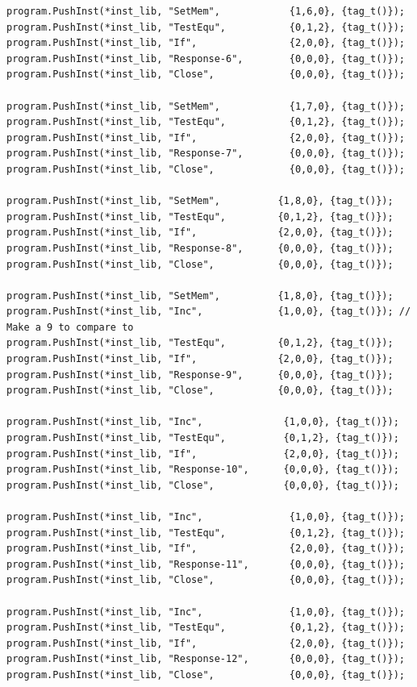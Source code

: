 \documentclass[]{book}
\begin{document}
\begin{verbatim}
program.PushInst(*inst_lib, "SetMem",            {1,6,0}, {tag_t()});
program.PushInst(*inst_lib, "TestEqu",           {0,1,2}, {tag_t()});
program.PushInst(*inst_lib, "If",                {2,0,0}, {tag_t()});
program.PushInst(*inst_lib, "Response-6",        {0,0,0}, {tag_t()});
program.PushInst(*inst_lib, "Close",             {0,0,0}, {tag_t()});

program.PushInst(*inst_lib, "SetMem",            {1,7,0}, {tag_t()});
program.PushInst(*inst_lib, "TestEqu",           {0,1,2}, {tag_t()});
program.PushInst(*inst_lib, "If",                {2,0,0}, {tag_t()});
program.PushInst(*inst_lib, "Response-7",        {0,0,0}, {tag_t()});
program.PushInst(*inst_lib, "Close",             {0,0,0}, {tag_t()});

program.PushInst(*inst_lib, "SetMem",          {1,8,0}, {tag_t()});
program.PushInst(*inst_lib, "TestEqu",         {0,1,2}, {tag_t()});
program.PushInst(*inst_lib, "If",              {2,0,0}, {tag_t()});
program.PushInst(*inst_lib, "Response-8",      {0,0,0}, {tag_t()});
program.PushInst(*inst_lib, "Close",           {0,0,0}, {tag_t()});

program.PushInst(*inst_lib, "SetMem",          {1,8,0}, {tag_t()});
program.PushInst(*inst_lib, "Inc",             {1,0,0}, {tag_t()}); // Make a 9 to compare to
program.PushInst(*inst_lib, "TestEqu",         {0,1,2}, {tag_t()});
program.PushInst(*inst_lib, "If",              {2,0,0}, {tag_t()});
program.PushInst(*inst_lib, "Response-9",      {0,0,0}, {tag_t()});
program.PushInst(*inst_lib, "Close",           {0,0,0}, {tag_t()});

program.PushInst(*inst_lib, "Inc",              {1,0,0}, {tag_t()});
program.PushInst(*inst_lib, "TestEqu",          {0,1,2}, {tag_t()});
program.PushInst(*inst_lib, "If",               {2,0,0}, {tag_t()});
program.PushInst(*inst_lib, "Response-10",      {0,0,0}, {tag_t()});
program.PushInst(*inst_lib, "Close",            {0,0,0}, {tag_t()});

program.PushInst(*inst_lib, "Inc",               {1,0,0}, {tag_t()});
program.PushInst(*inst_lib, "TestEqu",           {0,1,2}, {tag_t()});
program.PushInst(*inst_lib, "If",                {2,0,0}, {tag_t()});
program.PushInst(*inst_lib, "Response-11",       {0,0,0}, {tag_t()});
program.PushInst(*inst_lib, "Close",             {0,0,0}, {tag_t()});

program.PushInst(*inst_lib, "Inc",               {1,0,0}, {tag_t()});
program.PushInst(*inst_lib, "TestEqu",           {0,1,2}, {tag_t()});
program.PushInst(*inst_lib, "If",                {2,0,0}, {tag_t()});
program.PushInst(*inst_lib, "Response-12",       {0,0,0}, {tag_t()});
program.PushInst(*inst_lib, "Close",             {0,0,0}, {tag_t()});


\end{verbatim}
\end{document}
